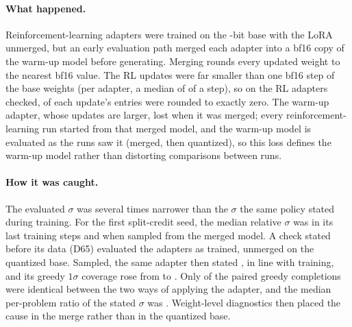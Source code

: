 \paragraph{What happened.}
Reinforcement-learning adapters were trained on the -bit base with the LoRA unmerged, but an early
evaluation path merged each adapter into a bf16 copy of the warm-up model before generating.
Merging rounds every updated weight to the nearest bf16 value.
The RL updates were far smaller than one bf16 step of the base weights (per adapter, a median of  of a
step), so on the  RL adapters checked,  of each update's entries were rounded to
exactly zero.
The warm-up adapter, whose updates are larger, lost  when it was merged; every reinforcement-learning
run started from that merged model, and the warm-up model is evaluated as the runs saw it (merged, then quantized), so
this loss defines the warm-up model rather than distorting comparisons between runs.

\paragraph{How it was caught.}
The evaluated $\sigma$ was several times narrower than the $\sigma$ the same policy stated during training.
For the first split-credit seed, the median relative $\sigma$ was  in its last training steps and
 when sampled from the merged model.
A check stated before its data (D65) evaluated the adapters as trained, unmerged on the quantized base.
Sampled, the same adapter then stated , in line with training, and its greedy $1\sigma$
coverage rose from  to .
Only  of the paired greedy completions were identical between the two ways of applying the adapter,
and the median per-problem ratio of the stated $\sigma$ was .
Weight-level diagnostics then placed the cause in the merge rather than in the quantized base.

